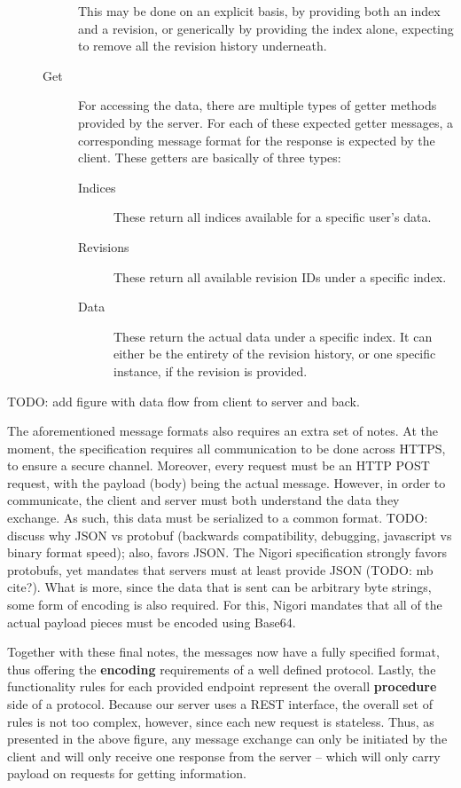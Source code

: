 \begin{description}
\begin{description}
    This may be done on an explicit basis, by providing both an index and a revision, or generically by providing the index alone, expecting to remove all the revision history underneath.
    \item[Get] For accessing the data, there are multiple types of getter methods provided by the server.
    For each of these expected getter messages, a corresponding message format for the response is expected by the client.
    These getters are basically of three types:
    \begin{description}
      \item[Indices] These return all indices available for a specific user's data.
      \item[Revisions] These return all available revision IDs under a specific index.
      \item[Data] These return the actual data under a specific index.
      It can either be the entirety of the revision history, or one specific instance, if the revision is provided.
    \end{description}
  \end{description}
\end{description}

TODO: add figure with data flow from client to server and back.

The aforementioned message formats also requires an extra set of notes.
At the moment, the specification requires all communication to be done across HTTPS, to ensure a secure channel.
Moreover, every request must be an HTTP POST request, with the payload (body) being the actual message.
However, in order to communicate, the client and server must both understand the data they exchange.
As such, this data must be serialized to a common format.
TODO: discuss why JSON vs protobuf (backwards compatibility, debugging, javascript vs binary format speed); also, favors JSON.
The Nigori specification strongly favors protobufs, yet mandates that servers must at least provide JSON (TODO: mb cite?).
What is more, since the data that is sent can be arbitrary byte strings, some form of encoding is also required.
For this, Nigori mandates that all of the actual payload pieces must be encoded using Base64.

Together with these final notes, the messages now have a fully specified format, thus offering the \textbf{encoding} requirements of a well defined protocol.
Lastly, the functionality rules for each provided endpoint represent the overall \textbf{procedure} side of a protocol.
Because our server uses a REST interface, the overall set of rules is not too complex, however, since each new request is stateless.
Thus, as presented in the above figure, any message exchange can only be initiated by the client and will only receive one response from the server -- which will only carry payload on requests for getting information.

